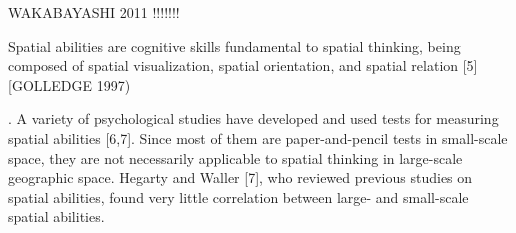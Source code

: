 WAKABAYASHI 2011 !!!!!!!

Spatial abilities are cognitive skills fundamental to spatial thinking, being composed of spatial
visualization, spatial orientation, and spatial relation [5]
[GOLLEDGE 1997)

. A variety of psychological studies have
developed and used tests for measuring spatial abilities [6,7]. Since most of them are paper-and-pencil
tests in small-scale space, they are not necessarily applicable to spatial thinking in large-scale geographic
space. Hegarty and Waller [7], who reviewed previous studies on spatial abilities, found very little
correlation between large- and small-scale spatial abilities. 



